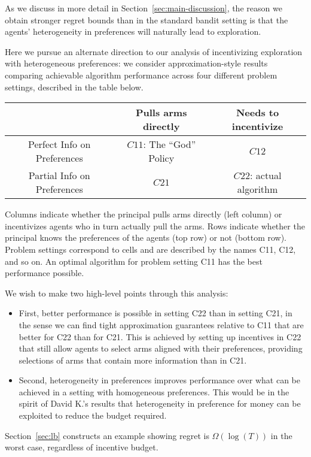 

As we discuss in more detail in Section~\ref{sec:main-discussion},
the reason we obtain stronger regret bounds than in the standard bandit
setting is that the agents' heterogeneity in preferences will
naturally lead to exploration.

Here we pursue an alternate direction to our analysis of incentivizing exploration with heterogeneous preferences: we consider approximation-style results comparing achievable algorithm performance across four different problem settings, described in the table below.

\begin{center}
\begin{tabular}{ c|c|c| } 
 \hline
     & Pulls arms directly & Needs to incentivize \\ 
\hline
 Perfect Info on Preferences & $C11$: The ``God'' Policy & $C12$ \\ 
 Partial Info on Preferences & $C21$ & $C22$: actual algorithm \\ 
 \hline
\end{tabular}
\end{center}

Columns indicate whether the principal pulls arms directly (left column) or incentivizes agents who in turn actually pull the arms. Rows indicate whether the principal knows the preferences of the agents (top row) or not (bottom row).   Problem settings correspond to cells and are described by the names C11, C12, and so on. An optimal algorithm for problem setting C11 has the best performance possible.

We wish to make two high-level points through this analysis:

\begin{itemize}
\item First, better performance is possible in setting C22 than in setting C21, in the sense we can find tight approximation guarantees relative to C11 that are better for C22 than for C21.  This is achieved by setting up incentives in C22 that still allow agents to select arms aligned with their preferences, providing selections of arms that contain more information than in C21.
\item Second, heterogeneity in preferences improves performance over what can be achieved in a setting with homogeneous preferences.  This would be in the spirit of David K.'s results that heterogeneity in preference for money can be exploited to reduce the budget required.
\end{itemize}



Section~\ref{sec:lb} constructs an example showing regret is $\Omega(\log(T))$ in the worst case, regardless of incentive budget.

